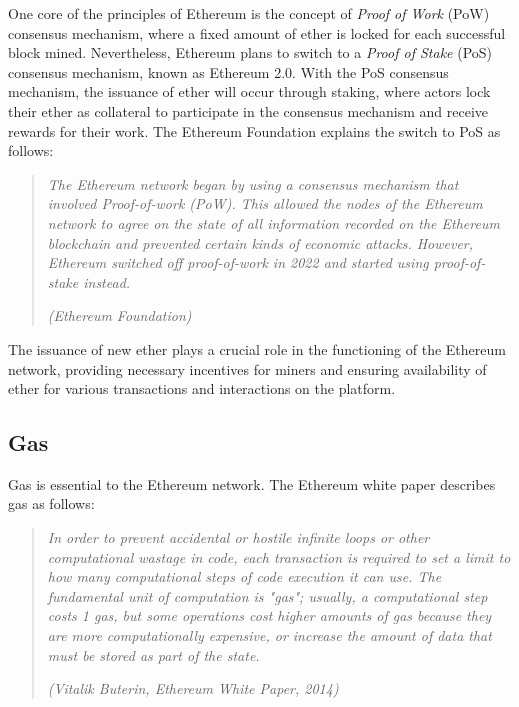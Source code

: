 One core of the principles of Ethereum is the concept of \textit{Proof of Work} (PoW) consensus mechanism, where a fixed amount of ether is locked
for each successful block mined. Nevertheless, Ethereum plans to switch to a \textit{Proof of Stake} (PoS) consensus mechanism, known as
Ethereum 2.0. With the PoS consensus mechanism, the issuance of ether will occur through staking, where actors lock their ether as collateral to
participate in the consensus mechanism and receive rewards for their work. The Ethereum Foundation \cite{eth_proofofstake} explains the switch
to PoS as follows:


\begin{quote}
   \textit{The Ethereum network began by using a consensus mechanism that involved Proof-of-work (PoW). This allowed the nodes of the Ethereum network to agree on the state of all information recorded on the Ethereum blockchain
   and prevented certain kinds of economic attacks. However, Ethereum switched off proof-of-work in 2022 and started using proof-of-stake instead.}


   \textit{(Ethereum Foundation)}
\end{quote}


The issuance of new ether plays a crucial role in the functioning of the Ethereum network, providing necessary incentives for miners and ensuring
availability of ether for various transactions and interactions on the platform.




\subsection{Gas}
\label{subsec:gas}


Gas is essential to the Ethereum network. The Ethereum white paper \cite{ethereum_white_paper} describes gas as follows:


\begin{quote}
   \textit{In order to prevent accidental or hostile infinite loops or other computational wastage in code, each transaction is
       required to set a limit to how many computational steps of code execution it can use. The fundamental unit of computation is "gas";
       usually, a computational step costs 1 gas, but some operations cost higher amounts of gas because they are more computationally expensive,
       or increase the amount of data that must be stored as part of the state.}


   \textit{(Vitalik Buterin, Ethereum White Paper, 2014)}
\end{quote}


